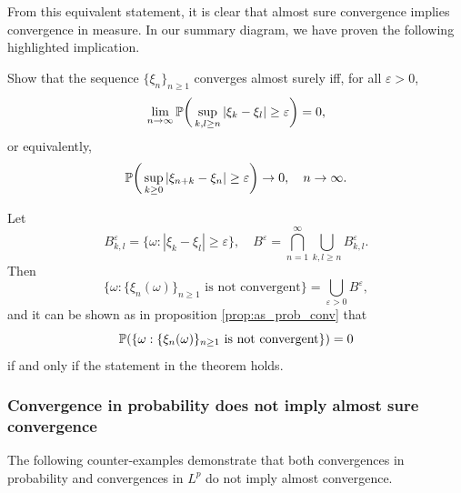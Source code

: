 From this equivalent statement, it is clear that almost sure convergence implies convergence in measure. In our summary diagram, we have proven the following highlighted implication.

\begin{figure} [H]
    \centering
\end{figure}

\begin{exercise} \label{ex:as_Cauchy}
Show that the sequence $\{\xi_n\}_{n\geq 1}$ converges almost surely iff, for all $\varepsilon > 0$, 
\begin{equation*}
    \lim_{n\to\infty} \mathbb{P} \bigg(\sup_{k, l \ge n} |\xi_{k} - \xi_l| \ge \varepsilon\bigg) = 0,
\end{equation*}
or equivalently,
\begin{equation*}
    \mathbb{P} \bigg(\sup_{k \ge 0} |\xi_{n+k} - \xi_n| \ge \varepsilon\bigg) \to 0, \quad n \to \infty.
\end{equation*}
\end{exercise}

\begin{hint}
Let
\begin{equation*}
    B_{k,l}^\varepsilon = \{ \omega: |\xi_k - \xi_l| \ge \varepsilon\} , \quad B^\varepsilon = \bigcap_{n=1}^\infty \bigcup_{k, l \ge n} B_{k,l}^\varepsilon.
\end{equation*}
Then 
$$\{ \omega: \{\xi_n(\omega) \}_{n\ge1} \text{ is not convergent} \} = \bigcup_{\varepsilon > 0}B^\varepsilon,$$ 
and it can be shown as in proposition \ref{prop:as_prob_conv} that 
$$\mathbb{P}(\{ \omega: \{\xi_n(\omega) \}_{n\ge1} \text{ is not convergent} \}) = 0$$ 
if and only if the statement in the theorem holds.
\end{hint}

\subsubsection{Convergence in probability does not imply almost sure convergence}

The following counter-examples demonstrate that both convergences in probability and convergences in $L^p$ do not imply almost convergence. 

